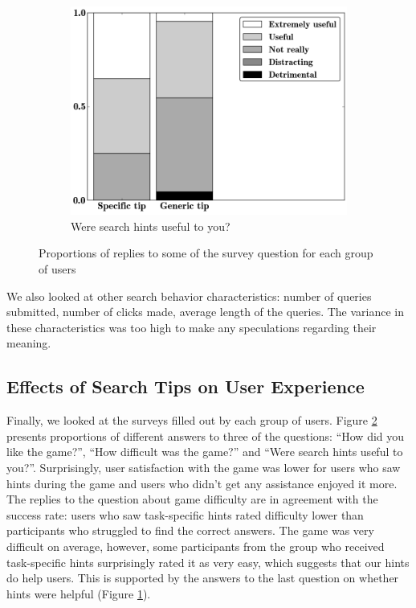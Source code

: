 \documentclass{sig-alternate}
\begin{document}
\begin{figure}[ht]
\begin{subfigure}[t]{0.3\textwidth}
	\includegraphics[scale=0.26]{img/useful}
	\caption{Were search hints useful to you?}
    \label{figure:survey:useful}
\end{subfigure}
\vspace{-2mm}
\caption{Proportions of replies to some of the survey question for each group of users}
\label{figure:survey}
\vspace{-4mm}
\end{figure}

\vspace{-3mm}
We also looked at other search behavior characteristics: number of queries submitted, number of clicks made, average length of the queries. The variance in these characteristics was too high to make any speculations regarding their meaning.

\subsection{Effects of Search Tips on User Experience}

Finally, we looked at the surveys filled out by each group of users.
Figure \ref{figure:survey} presents proportions of different answers to three of the questions: ``How did you like the game?'', ``How difficult was the game?'' and ``Were search hints useful to you?''.
Surprisingly, user satisfaction with the game was lower for users who saw hints during the game and users who didn't get any assistance enjoyed it more.
The replies to the question about game difficulty are in agreement with the success rate: users who saw task-specific hints rated difficulty lower than participants who struggled to find the correct answers.
The game was very difficult on average, however, some participants from the group who received task-specific hints surprisingly rated it as very easy, which suggests that our hints do help users.
This is supported by the answers to the last question on whether hints were helpful (Figure \ref{figure:survey:useful}).
\end{document}
